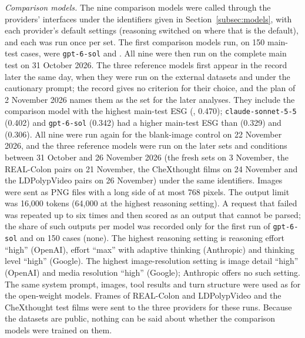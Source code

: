 \emph{Comparison models.} The nine comparison models were called through the providers' interfaces under the identifiers given in Section~\ref{subsec:models}, with each provider's default settings (reasoning switched on where that is the default), and each was run once per set. The first comparison models run, on 150 main-test cases, were \texttt{gpt-6-sol} and \gem. All nine were then run on the complete main test on 31 October 2026. The three reference models first appear in the record later the same day, when they were run on the external datasets and under the cautionary prompt; the record gives no criterion for their choice, and the plan of 2 November 2026 names them as the set for the later analyses. They include the comparison model with the highest main-test ESG (\gem, 0.470); \texttt{claude-sonnet-5-5} (0.402) and \texttt{gpt-6-sol} (0.342) had a higher main-test ESG than \opus{} (0.329) and \gpt{} (0.306). All nine were run again for the blank-image control on 22 November 2026, and the three reference models were run on the later sets and conditions between 31 October and 26 November 2026 (the fresh sets on 3 November, the REAL-Colon pairs on 21 November, the CheXthought films on 24 November and the LDPolypVideo pairs on 26 November) under the same identifiers. Images were sent as PNG files with a long side of at most 768 pixels. The output limit was 16,000 tokens (64,000 at the highest reasoning setting). A request that failed was repeated up to six times and then scored as an output that cannot be parsed; the share of such outputs per model was recorded only for the first run of \texttt{gpt-6-sol} and \gem{} on 150 cases (none). The highest reasoning setting is reasoning effort ``high'' (OpenAI), effort ``max'' with adaptive thinking (Anthropic) and thinking level ``high'' (Google). The highest image-resolution setting is image detail ``high'' (OpenAI) and media resolution ``high'' (Google); Anthropic offers no such setting. The same system prompt, images, tool results and turn structure were used as for the open-weight models. Frames of REAL-Colon and LDPolypVideo and the CheXthought test films were sent to the three providers for these runs. Because the datasets are public, nothing can be said about whether the comparison models were trained on them.

